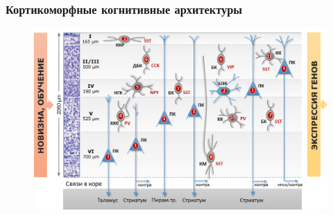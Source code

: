 \documentclass[default]{beamer}
\begin{document}
	\begin{frame}
		\frametitle{Кортикоморфные когнитивные архитектуры}
		
		\begin{figure}
			\includegraphics[width=\textwidth]{info_allocat}
		\end{figure}
	\end{frame}	
\end{document}
